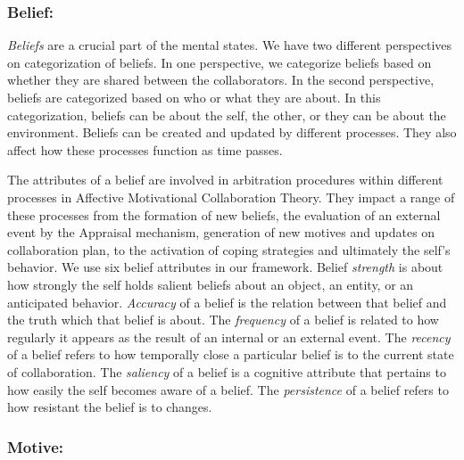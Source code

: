 \documentclass{aamas2016}
\begin{document}
\vspace*{-2mm}
\subsubsection{Belief:}

\textit{Beliefs} are a crucial part of the mental states. We have two different
perspectives on categorization of beliefs. In one perspective, we categorize
beliefs based on whether they are shared between the collaborators. In the
second perspective, beliefs are categorized based on who or what they are about.
In this categorization, beliefs can be about the self, the other, or they can be
about the environment. Beliefs can be created and updated by different
processes. They also affect how these processes function as time passes.

The attributes of a belief are involved in arbitration procedures within
different processes in Affective Motivational Collaboration Theory. They impact
a range of these processes from the formation of new beliefs, the evaluation of
an external event by the Appraisal mechanism, generation of new motives and
updates on collaboration plan, to the activation of coping strategies and
ultimately the self's behavior. We use six belief attributes in our framework.
Belief \textit{strength} is about how strongly the self holds salient beliefs
about an object, an entity, or an anticipated behavior. \textit{Accuracy} of a
belief is the relation between that belief and the truth which that belief is
about. The \textit{frequency} of a belief is related to how regularly it appears
as the result of an internal or an external event. The \textit{recency} of a
belief refers to how temporally close a particular belief is to the current
state of collaboration. The \textit{saliency} of a belief is a cognitive
attribute that pertains to how easily the self becomes aware of a belief. The
\textit{persistence} of a belief refers to how resistant the belief is to
changes.

\vspace*{-2mm}
\subsubsection{Motive:}
\end{document}
